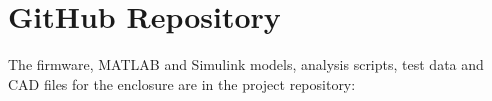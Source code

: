 \chapter{GitHub Repository}
\label{app:github}

The firmware, MATLAB and Simulink models, analysis scripts, test data and CAD files for the enclosure are in the project repository:

\begin{center}
    \gitrepo
\end{center}

